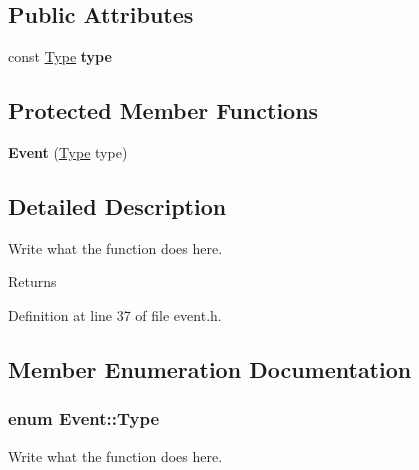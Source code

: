 \subsection*{Public Attributes}
\begin{DoxyCompactItemize}
\item 
\hypertarget{classEvent_a86404000a5e0b6b3afdb2c88d4923e3b}{const \hyperlink{classEvent_a2abf13b5be49315e9e362af02029f058}{Type} {\bfseries type}}\label{classEvent_a86404000a5e0b6b3afdb2c88d4923e3b}

\end{DoxyCompactItemize}
\subsection*{Protected Member Functions}
\begin{DoxyCompactItemize}
\item 
\hypertarget{classEvent_a07dd964621d0623bfccc24197c2f509b}{{\bfseries Event} (\hyperlink{classEvent_a2abf13b5be49315e9e362af02029f058}{Type} type)}\label{classEvent_a07dd964621d0623bfccc24197c2f509b}

\end{DoxyCompactItemize}


\subsection{Detailed Description}
Write what the function does here. 

\begin{DoxyReturn}{Returns}

\end{DoxyReturn}


Definition at line 37 of file event.\+h.



\subsection{Member Enumeration Documentation}
\hypertarget{classEvent_a2abf13b5be49315e9e362af02029f058}{
\subsubsection[{Type}]{\setlength{\rightskip}{0pt plus 5cm}enum {\bf Event\+::\+Type}}}\label{classEvent_a2abf13b5be49315e9e362af02029f058}


Write what the function does here. 

